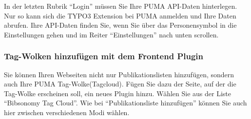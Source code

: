 \newline
\newline
In der letzten Rubrik \enquote{Login} müssen Sie Ihre PUMA API-Daten hinterlegen. Nur so kann sich die TYPO3 Extension bei PUMA anmelden und Ihre Daten abrufen. Ihre API-Daten finden Sie, wenn Sie über das Personensymbol in die Einstellungen gehen und im Reiter \enquote{Einstellungen} nach unten scrollen. \newline
\newline
\subsubsection*{Tag-Wolken hinzufügen mit dem Frontend Plugin}\label{sss:typo3Tagwolken}
Sie können Ihren Webseiten nicht nur Publikationslisten hinzufügen, sondern auch Ihre PUMA  Tag-Wolke(Tagcloud). Fügen Sie dazu der Seite, auf der die Tag-Wolke erscheinen soll, ein neues Plugin hinzu. Wählen Sie aus der Liste \enquote{Bibsonomy Tag Cloud}.\newline \newline 
Wie bei \enquote{Publikationsliste hinzufügen} können Sie auch hier zwischen verschiedenen Modi wählen.\newline \newline 
